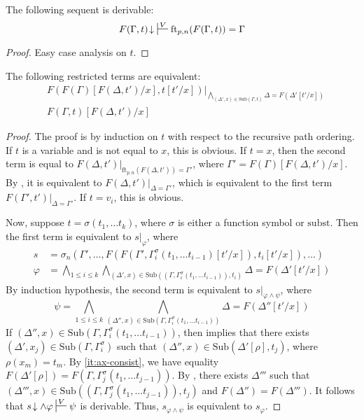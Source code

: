 \documentclass[reqno]{amsart}
\theoremstyle{definition}
\theoremstyle{remark}
\newcommand{\fs}[1]{\mathrm{#1}}
\newcommand{\subst}{\fs{subst}}
\newcommand{\ft}{\fs{ft}}
\newcommand{\sub}{\fs{Sub}}
\numberwithin{figure}{section}
\begin{document}
\begin{lem}
The following sequent is derivable:
\[ F(\Gamma,t)\!\downarrow\ \sststile{}{V} \ft_{p,n}(F(\Gamma,t)) = \Gamma \]
\end{lem}
\begin{proof}
Easy case analysis on $t$.
\end{proof}

\begin{lem}
The following restricted terms are equivalent:
\begin{align*}
& F(F(\Gamma)[F(\Delta,t')/x], t[t'/x])|_{\bigwedge_{(\Delta',x) \in \sub(\Gamma,t)} \Delta = F(\Delta'[t'/x])} \\
& F(\Gamma,t)[F(\Delta,t')/x]
\end{align*}
\end{lem}
\begin{proof}
The proof is by induction on $t$ with respect to the recursive path ordering.
If $t$ is a variable and is not equal to $x$, this is obvious.
If $t = x$, then the second term is equal to $F(\Delta,t')|_{\ft_{p,n}(F(\Delta,t')) = \Gamma'}$, where $\Gamma' = F(\Gamma)[F(\Delta,t')/x]$.
By , it is equivalent to $F(\Delta,t')|_{\Delta = \Gamma'}$, which is equivalent to the first term $F(\Gamma',t')|_{\Delta = \Gamma'}$.
If $t = v_i$, this is obvious.

Now, suppose $t = \sigma(t_1, \ldots t_k)$, where $\sigma$ is either a function symbol or $\subst$.
Then the first term is equivalent to $s|_\varphi$, where
\begin{align*}
s & = \sigma_n(\Gamma', \ldots, F(F(\Gamma', \Gamma^\sigma_i(t_1, \ldots t_{i-1})[t'/x]), t_i[t'/x]), \ldots) \\
\varphi & = \bigwedge_{1 \leq i \leq k} \bigwedge_{(\Delta',x) \in \sub((\Gamma,\Gamma^\sigma_i(t_1, \ldots t_{i-1})),t_i)} \Delta = F(\Delta'[t'/x])
\end{align*}
By induction hypothesis, the second term is equivalent to $s|_{\varphi \land \psi}$, where
\[ \psi = \bigwedge_{1 \leq i \leq k} \bigwedge_{(\Delta'',x) \in \sub(\Gamma,\Gamma^\sigma_i(t_1, \ldots t_{i-1}))} \Delta = F(\Delta''[t'/x]) \]
If $(\Delta'',x) \in \sub(\Gamma,\Gamma^\sigma_i(t_1, \ldots t_{i-1}))$, then  implies that there exists $(\Delta',x_j) \in \sub(\Gamma,\Gamma^\sigma_i)$ such that $(\Delta'',x) \in \sub(\Delta'[\rho], t_j)$, where $\rho(x_m) = t_m$.
By \eqref{it:ax-consist}, we have equality $F(\Delta'[\rho]) = F(\Gamma,\Gamma^\sigma_j(t_1, \ldots t_{j-1}))$.
By , there exists $\Delta'''$ such that $(\Delta''',x) \in \sub((\Gamma,\Gamma^\sigma_j(t_1, \ldots t_{j-1})), t_j)$ and $F(\Delta'') = F(\Delta''')$.
It follows that $s\!\downarrow \land \varphi \sststile{}{V} \psi$ is derivable.
Thus, $s_{\varphi \land \psi}$ is equivalent to $s_\varphi$.
\end{proof}
\end{document}
